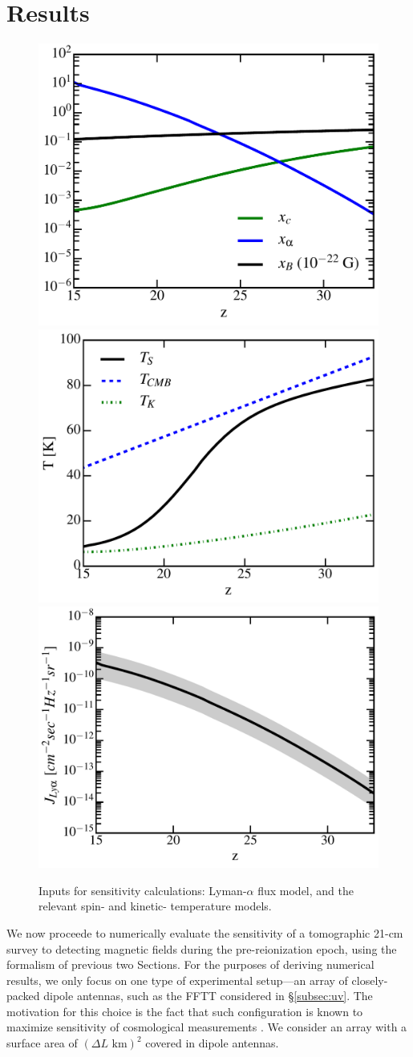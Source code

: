 \section{Results}
\label{sec:results}

\begin{figure}
\centering
\includegraphics[width=.35\textwidth,keepaspectratio=true]{xs.pdf}
\includegraphics[width=.35\textwidth,keepaspectratio=true]{Ts.pdf}
\includegraphics[width=.35\textwidth,keepaspectratio=true]{Jlya.pdf}
\caption{Inputs for sensitivity calculations: Lyman-$\alpha$ flux model, and the relevant spin- and kinetic- temperature models. \label{fig:cosmo}}
\end{figure}
We now proceede to numerically evaluate the sensitivity of a tomographic 21-cm survey to detecting magnetic fields during the pre-reionization epoch, using the formalism of previous two Sections. For the purposes of deriving numerical results, we only focus on one type of experimental setup---an array of closely-packed dipole antennas, such as the FFTT considered in \S\ref{subsec:uv}. The motivation for this choice is the fact that such configuration is known to maximize sensitivity of cosmological measurements \cite{2009PhRvD..79h3530T}. We consider an array with a surface area of $(\Delta L\text{ km})^2$ covered in dipole antennas.

